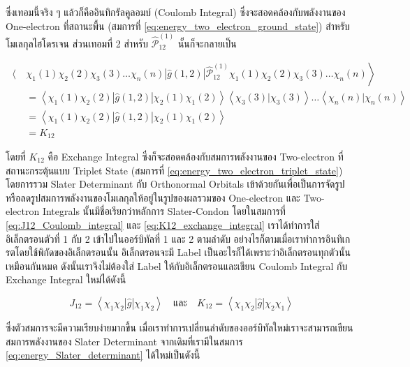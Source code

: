 \noindent ซึ่งเทอมนี้จริง ๆ แล้วก็คืออินทิกรัลคูลอมบ์ (Coulomb Integral) ซึ่งจะสอดคล้องกับพลังงานของ One-electron ที่สถานะพื้น
(สมการที่ \ref{eq:energy_two_electron_ground_state}) สำหรับโมเลกุลไฮโดรเจน ส่วนเทอมที่ 2 สำหรับ
$\hat{\mathcal{P}}_{12}^{(1)}$ นั้นก็จะกลายเป็น

\begin{equation}
    \label{eq:K12_exchange_integral}
    \begin{aligned}
        \left\langle \right. & \chi_1(1) \chi_2(2) \chi_3(3) \dots \chi_n(n)
        |\hat{g}(1,2)|
        \hat{\mathscr{P}}_{12}^{(1)} \chi_1(1) \chi_2(2) \chi_3(3) \dots \chi_n(n) \left. \right\rangle \\
                             & = \left\langle\chi_1(1) \chi_2(2)
        |\hat{g}(1,2)|
        \chi_2(1) \chi_1(2)\right\rangle
        \left\langle\chi_3(3)|\chi_3(3)\right\rangle \dots\left\langle\chi_n(n)|\chi_n(n)\right\rangle  \\
                             & = \left\langle\chi_1(1) \chi_2(2)
        |\hat{g}(1,2)|
        \chi_2(1) \chi_1(2)\right\rangle                                                                \\
                             & = K_{12}
    \end{aligned}
\end{equation}

\noindent โดยที่ $K_{12}$ คือ Exchange Integral ซึ่งก็จะสอดคล้องกับสมการพลังงานของ Two-electron ที่สถานะกระตุ้นแบบ Triplet
State (สมการที่ \ref{eq:energy_two_electron_triplet_state}) โดยการรวม Slater Determinant กับ Orthonormal Orbitals
เข้าด้วยกันเพื่อเป็นการจัดรูปหรือลดรูปสมการพลังงานของโมเลกุลให้อยู่ในรูปของผลรวมของ One-electron และ Two-electron Integrals
นั้นมีชื่อเรียกว่าหลักการ Slater-Condon โดยในสมการที่ \ref{eq:J12_Coulomb_integral} และ \ref{eq:K12_exchange_integral}
เราได้ทำการใส่อิเล็กตรอนตัวที่ 1 กับ 2 เข้าไปในออร์บิทัลที่ 1 และ 2 ตามลำดับ อย่างไรก็ตามเมื่อเราทำการอินทิเกรตโดยใช้พิกัดของอิเล็กตรอนนั้น%
อิเล็กตรอนจะมี Label เป็นอะไรก็ได้เพราะว่าอิเล็กตรอนทุกตัวนั้นเหมือนกันหมด ดังนั้นเราจึงไม่ต้องใส่ Label ให้กับอิเล็กตรอนและเขียน Coulomb
Integral กับ Exchange Integral ใหม่ได้ดังนี้

\begin{equation}
    J_{12} = \left\langle\chi_1 \chi_2|\hat{g}| \chi_1 \chi_2\right\rangle
    \quad \text{และ} \quad
    K_{12} = \left\langle\chi_1 \chi_2|\hat{g}| \chi_2 \chi_1\right\rangle
\end{equation}

\noindent ซึ่งตัวสมการจะมีความเรียบง่ายมากขึ้น เมื่อเราทำการเปลี่ยนลำดับของออร์บิทัลใหม่เราจะสามารถเขียนสมการพลังงานของ Slater
Determinant จากเดิมที่เรามีในสมการ \ref{eq:energy_Slater_determinant} ได้ใหม่เป็นดังนี้

